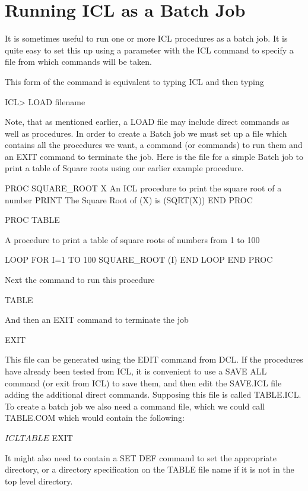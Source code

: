 \documentclass[twoside,11pt,nolof,chapters]{starlink}
\begin{document}
\section{Running ICL as a Batch Job\label{running_as_batch_job}}
It is sometimes useful to run one or more ICL procedures as a batch job.
It is quite easy to set this up using a parameter with the ICL command to
specify a file from which commands will be taken.
This form of the command is equivalent to typing ICL and then typing
\begin{terminalv}
    ICL> LOAD filename
\end{terminalv}
Note, that as mentioned earlier, a LOAD file may include direct commands
as well as procedures. In order to create a Batch job we must set up a file
which contains all the procedures we want, a command (or commands) to run them
and an EXIT command to terminate the job. Here is the file for a simple
Batch job to print a table of Square roots using our earlier example
procedure.
\begin{terminalv}

    PROC SQUARE_ROOT X
    {  An ICL procedure to print the square root of a number   }
    PRINT The Square Root of (X) is (SQRT(X))
    END PROC

    PROC TABLE

    { A procedure to print a table of square roots of numbers  }
    { from 1 to 100                                            }

      LOOP FOR I=1 TO 100
        SQUARE_ROOT (I)
      END LOOP
    END PROC

    {  Next the command to run this procedure  }

    TABLE

    {  And then an EXIT command to terminate the job  }

    EXIT

\end{terminalv}
This file can be generated using the EDIT command from DCL. If the
procedures have already been tested from ICL, it is convenient to use
a SAVE ALL command (or exit from ICL) to save them, and then edit the
SAVE.ICL file adding the additional direct commands.
Supposing this file is called TABLE.ICL. To create a batch job we also
need a command file, which we could call TABLE.COM which would contain
the following:
\begin{terminalv}

    $ ICL TABLE
    $ EXIT

\end{terminalv}
It might also need to contain a SET DEF command to set the appropriate
directory, or a directory specification on the TABLE file name if it is
not in the top level directory.
\end{document}

